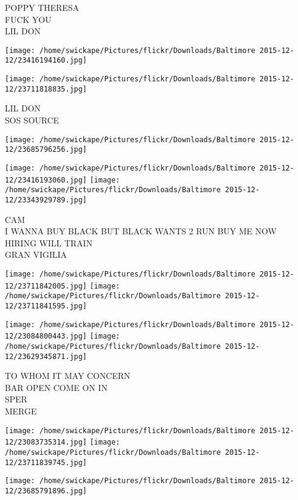 \documentclass[10pt,letterpaper]{article}
\begin{document}
POPPY THERESA\\
FUCK YOU\\
LIL DON\\
\pagebreak

\texttt{[image: /home/swickape/Pictures/flickr/Downloads/Baltimore 2015-12-12/23416194160.jpg]}

\vspace{0.25in}
\texttt{[image: /home/swickape/Pictures/flickr/Downloads/Baltimore 2015-12-12/23711818835.jpg]}

LIL DON\\
SOS SOURCE\\
\pagebreak

\texttt{[image: /home/swickape/Pictures/flickr/Downloads/Baltimore 2015-12-12/23685796256.jpg]}

\vspace{0.25in}
\texttt{[image: /home/swickape/Pictures/flickr/Downloads/Baltimore 2015-12-12/23416193060.jpg]}
\texttt{[image: /home/swickape/Pictures/flickr/Downloads/Baltimore 2015-12-12/23343929789.jpg]}

CAM\\
I WANNA BUY BLACK BUT BLACK WANTS 2 RUN BUY ME NOW HIRING WILL TRAIN\\
GRAN VIGILIA\\
\pagebreak

\texttt{[image: /home/swickape/Pictures/flickr/Downloads/Baltimore 2015-12-12/23711842005.jpg]}
\texttt{[image: /home/swickape/Pictures/flickr/Downloads/Baltimore 2015-12-12/23711841595.jpg]}

\texttt{[image: /home/swickape/Pictures/flickr/Downloads/Baltimore 2015-12-12/23084800443.jpg]}
\texttt{[image: /home/swickape/Pictures/flickr/Downloads/Baltimore 2015-12-12/23629345871.jpg]}

TO WHOM IT MAY CONCERN\\
BAR OPEN COME ON IN\\
SPER\\
MERGE\\
\pagebreak

\texttt{[image: /home/swickape/Pictures/flickr/Downloads/Baltimore 2015-12-12/23083735314.jpg]}
\texttt{[image: /home/swickape/Pictures/flickr/Downloads/Baltimore 2015-12-12/23711839745.jpg]}

\vspace{0.25in}
\texttt{[image: /home/swickape/Pictures/flickr/Downloads/Baltimore 2015-12-12/23685791896.jpg]}
\end{document}
